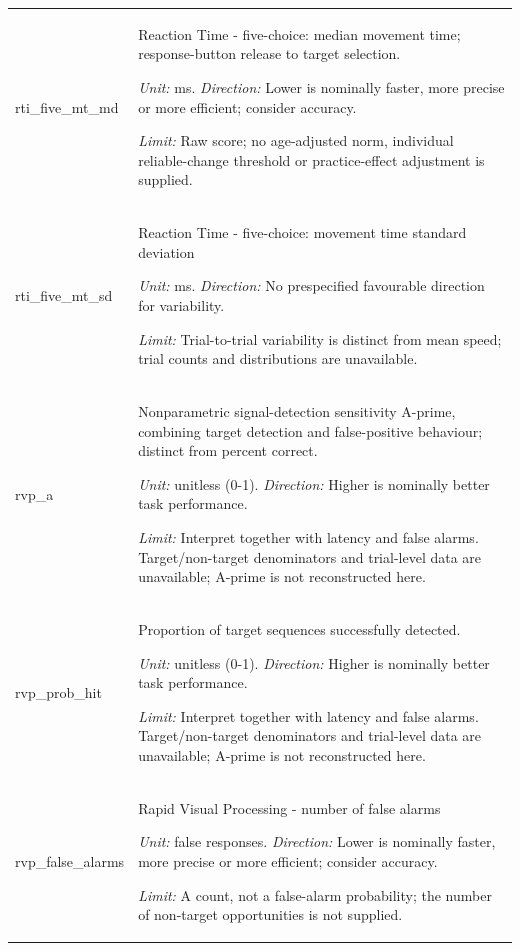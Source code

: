 \begin{longtable}{p{.26\linewidth}p{.66\linewidth}}
{\ttfamily\footnotesize rti\_\allowbreak{}five\_\allowbreak{}mt\_\allowbreak{}md} & Reaction Time - five-choice: median movement time; response-button release to target selection.\par\textit{Unit:} ms. \textit{Direction:} Lower is nominally faster, more precise or more efficient; consider accuracy.\par\textit{Limit:} Raw score; no age-adjusted norm, individual reliable-change threshold or practice-effect adjustment is supplied. \\[7pt]
{\ttfamily\footnotesize rti\_\allowbreak{}five\_\allowbreak{}mt\_\allowbreak{}sd} & Reaction Time - five-choice: movement time standard deviation\par\textit{Unit:} ms. \textit{Direction:} No prespecified favourable direction for variability.\par\textit{Limit:} Trial-to-trial variability is distinct from mean speed; trial counts and distributions are unavailable. \\[7pt]
{\ttfamily\footnotesize rvp\_\allowbreak{}a} & Nonparametric signal-detection sensitivity A-prime, combining target detection and false-positive behaviour; distinct from percent correct.\par\textit{Unit:} unitless (0-1). \textit{Direction:} Higher is nominally better task performance.\par\textit{Limit:} Interpret together with latency and false alarms. Target/non-target denominators and trial-level data are unavailable; A-prime is not reconstructed here. \\[7pt]
{\ttfamily\footnotesize rvp\_\allowbreak{}prob\_\allowbreak{}hit} & Proportion of target sequences successfully detected.\par\textit{Unit:} unitless (0-1). \textit{Direction:} Higher is nominally better task performance.\par\textit{Limit:} Interpret together with latency and false alarms. Target/non-target denominators and trial-level data are unavailable; A-prime is not reconstructed here. \\[7pt]
{\ttfamily\footnotesize rvp\_\allowbreak{}false\_\allowbreak{}alarms} & Rapid Visual Processing - number of false alarms\par\textit{Unit:} false responses. \textit{Direction:} Lower is nominally faster, more precise or more efficient; consider accuracy.\par\textit{Limit:} A count, not a false-alarm probability; the number of non-target opportunities is not supplied. \\[7pt]

\end{longtable}
